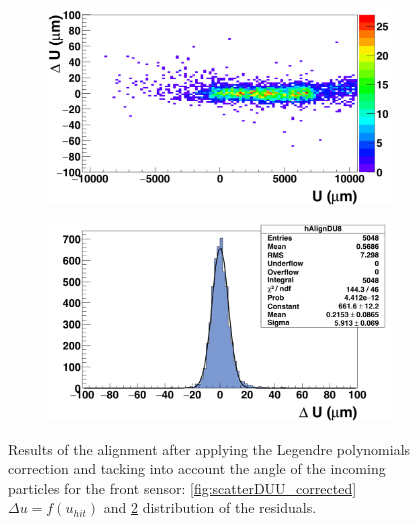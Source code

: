 \begin{figure}[!h]
        \begin{subfigure}[t]{0.45\textwidth}
          \centering
          \includegraphics[width = 1.2\textwidth]{Pictures/deformation/deltaUU_8_corrected1.png}
          \caption{}
          \label{fig:scatterDUU_corrected_front}
        \end{subfigure}
        \hfill
        \begin{subfigure}[t]{0.45\textwidth}
          \centering
          \includegraphics[width = 1.2\textwidth]{Pictures/deformation/deltaU_8_corrected1.png}
          \caption{}
          \label{fig:residualU_corrected}
        \end{subfigure}
        \caption{Results of the alignment after applying the Legendre polynomials correction and tacking into account the angle of the incoming particles for the front sensor: \ref{fig:scatterDUU_corrected} $\Delta u=f(u_{hit})$ and \ref{fig:residualU_corrected} distribution of the residuals.}
        \label{fig:alignmnetCorrected}

      \end{figure}

